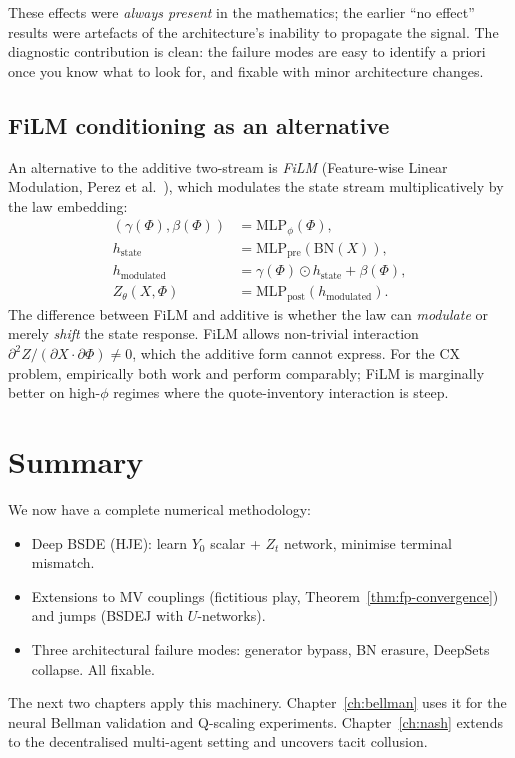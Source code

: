 These effects were \emph{always present} in the mathematics; the earlier ``no effect'' results were artefacts of the architecture's inability to propagate the signal. The diagnostic contribution is clean: the failure modes are easy to identify a priori once you know what to look for, and fixable with minor architecture changes.

\subsection{FiLM conditioning as an alternative}

An alternative to the additive two-stream is \emph{FiLM} (Feature-wise Linear Modulation, Perez et al.\ \cite{perez2018}), which modulates the state stream multiplicatively by the law embedding:
\begin{align}
  (\gamma(\Phi), \beta(\Phi)) &= \mathrm{MLP}_\phi(\Phi), \\
  h_{\text{state}} &= \mathrm{MLP}_{\text{pre}}(\text{BN}(X)), \\
  h_{\text{modulated}} &= \gamma(\Phi) \odot h_{\text{state}} + \beta(\Phi), \\
  Z_\theta(X, \Phi) &= \mathrm{MLP}_{\text{post}}(h_{\text{modulated}}).
\end{align}
The difference between FiLM and additive is whether the law can \emph{modulate} or merely \emph{shift} the state response. FiLM allows non-trivial interaction $\partial^2 Z / (\partial X \cdot \partial \Phi) \neq 0$, which the additive form cannot express. For the CX problem, empirically both work and perform comparably; FiLM is marginally better on high-$\phi$ regimes where the quote-inventory interaction is steep.

\section{Summary}

We now have a complete numerical methodology:
\begin{itemize}[leftmargin=2em]
  \item Deep BSDE (HJE): learn $Y_0$ scalar + $Z_t$ network, minimise terminal mismatch.
  \item Extensions to MV couplings (fictitious play, Theorem~\ref{thm:fp-convergence}) and jumps (BSDEJ with $U$-networks).
  \item Three architectural failure modes: generator bypass, BN erasure, DeepSets collapse. All fixable.
\end{itemize}

The next two chapters apply this machinery. Chapter~\ref{ch:bellman} uses it for the neural Bellman validation and Q-scaling experiments. Chapter~\ref{ch:nash} extends to the decentralised multi-agent setting and uncovers tacit collusion.
